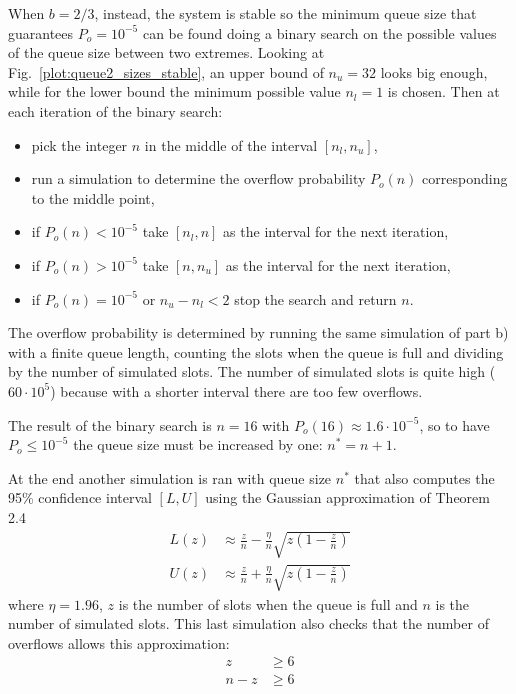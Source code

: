 \documentclass[a4paper,oneside]{article}
\begin{document}
When $b = 2/3$, instead, the system is stable so the minimum queue
size that guarantees $P_o = 10^{-5}$ can be found doing a binary
search on the possible values of the queue size between two extremes.
Looking at Fig.~\ref{plot:queue2_sizes_stable}, an upper bound of $n_u
= 32$ looks big enough, while for the lower bound the minimum possible
value $n_l = 1$ is chosen. Then at each iteration of the binary
search:
\begin{itemize}
\item pick the integer $n$ in the middle of the interval $[n_l, n_u]$,
\item run a simulation to determine the overflow probability $P_o(n)$
  corresponding to the middle point,
\item if $P_o(n) < 10^{-5}$ take $[n_l, n]$ as the interval for the next iteration,
\item if $P_o(n) > 10^{-5}$ take $[n, n_u]$ as the interval for the next iteration,
\item if $P_o(n) = 10^{-5}$ or $n_u - n_l < 2$ stop the search and return $n$.
\end{itemize}
The overflow probability is determined by running the same simulation
of part b) with a finite queue length, counting the slots when the
queue is full and dividing by the number of simulated slots. The
number of simulated slots is quite high ($60 \cdot 10^5$) because with
a shorter interval there are too few overflows.

The result of the binary search is $n=16$ with $P_o(16) \approx
1.6\cdot10^{-5}$, so to have $P_o \leq 10^{-5}$ the queue size must be
increased by one: $n^* = n+1$.

At the end another simulation is ran with queue size $n^*$ that also
computes the 95\% confidence interval $[L, U]$ using the Gaussian
approximation of Theorem 2.4
\begin{align*}
  L(z) & \approx \frac{z}{n} - \frac{\eta}{n}\sqrt{z\left(1-\frac{z}{n}\right)} \\
  U(z) & \approx \frac{z}{n} + \frac{\eta}{n}\sqrt{z\left(1-\frac{z}{n}\right)}
\end{align*}
where $\eta = 1.96$, $z$ is the number of slots when the queue is full
and $n$ is the number of simulated slots. This last simulation also
checks that the number of overflows allows this approximation:
\begin{align*}
  z & \geq 6 \\
  n-z & \geq 6
\end{align*}
\end{document}
